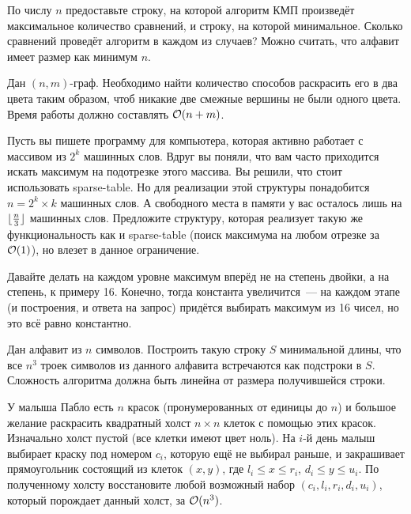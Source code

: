 \documentclass[addpoints]{exam}
\begin{document}
\begin{questions}

\question[2] По числу $n$ предоставьте строку, на которой алгоритм КМП произведёт максимальное количество сравнений, и строку, на которой минимальное. Сколько сравнений проведёт алгоритм в каждом из случаев? Можно считать, что алфавит имеет размер как минимум $n$.

\question[2] Дан $(n,m)$-граф. Необходимо найти количество способов раскрасить его в два цвета таким образом, чтоб никакие две смежные вершины не были одного цвета. Время работы должно составлять $\mathcal{O}(n + m)$.

\question[3] Пусть вы пишете программу для компьютера, которая активно работает с массивом из $2^k$ машинных слов. Вдруг вы поняли, что вам часто приходится искать максимум  на подотрезке этого массива. Вы решили, что стоит использовать sparse-table. Но для реализации этой структуры понадобится $n=2^{k} \times k$ машинных слов. А свободного места в памяти у вас осталось лишь на $\lfloor\frac{n}{3}\rfloor$ машинных слов. Предложите структуру, которая реализует такую же функциональность как и sparse-table (поиск максимума на любом отрезке за $\mathcal{O}(1)$), но влезет в данное ограничение.  

\begin{solution}

Давайте делать на каждом уровне максимум вперёд не на степень двойки, а на степень, к примеру 16. Конечно, тогда константа увеличится~--- на каждом этапе (и построения, и ответа на запрос) придётся выбирать максимум из 16 чисел, но это всё равно константно.

\end{solution}

\question[3] Дан алфавит из $n$ символов. Построить такую строку $S$ минимальной длины, что все $n^3$ троек символов из данного алфавита встречаются как подстроки в $S$. Сложность алгоритма должна быть линейна от размера получившейся строки. 

\question[3] У малыша Пабло есть $n$ красок (пронумерованных от единицы до $n$) и большое желание раскрасить квадратный холст $n \times n$ клеток с помощью этих красок. Изначально холст пустой (все клетки имеют цвет ноль). На $i$-й день малыш выбирает краску под номером $c_i$, которую ещё не выбирал раньше, и закрашивает прямоугольник состоящий из клеток $(x,y)$, где $l_i \leq x \leq r_i$, $d_i \leq y \leq u_i$. По полученному холсту восстановите любой возможный набор $(c_i,l_i,r_i,d_i,u_i)$, который порождает данный холст, за $\mathcal{O}(n^3)$.


\end{questions}
\end{document}
